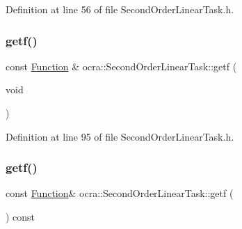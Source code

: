 Definition at line 56 of file Second\+Order\+Linear\+Task.\+h.

\hypertarget{classocra_1_1SecondOrderLinearTask_ac370b605ace05a35f3a5f68a49439c2d}{}\label{classocra_1_1SecondOrderLinearTask_ac370b605ace05a35f3a5f68a49439c2d} 
\subsubsection{\texorpdfstring{getf()}{getf()}\hspace{0.1cm}{\footnotesize\ttfamily [1/2]}}
{\footnotesize\ttfamily const \hyperlink{classocra_1_1Function}{Function} \& ocra\+::\+Second\+Order\+Linear\+Task\+::getf (\begin{DoxyParamCaption}\item[{void}]{ }\end{DoxyParamCaption})\hspace{0.3cm}{\ttfamily [inline]}}



Definition at line 95 of file Second\+Order\+Linear\+Task.\+h.

\hypertarget{classocra_1_1SecondOrderLinearTask_a3493f2c47a42df1be0de33a4b7f473ac}{}\label{classocra_1_1SecondOrderLinearTask_a3493f2c47a42df1be0de33a4b7f473ac} 
\subsubsection{\texorpdfstring{getf()}{getf()}\hspace{0.1cm}{\footnotesize\ttfamily [2/2]}}
{\footnotesize\ttfamily const \hyperlink{classocra_1_1Function}{Function}\& ocra\+::\+Second\+Order\+Linear\+Task\+::getf (\begin{DoxyParamCaption}{ }\end{DoxyParamCaption}) const}

\hypertarget{classocra_1_1SecondOrderLinearTask_a626defc13e1da5ae7b340b9e8591c840}{}\label{classocra_1_1SecondOrderLinearTask_a626defc13e1da5ae7b340b9e8591c840} 
